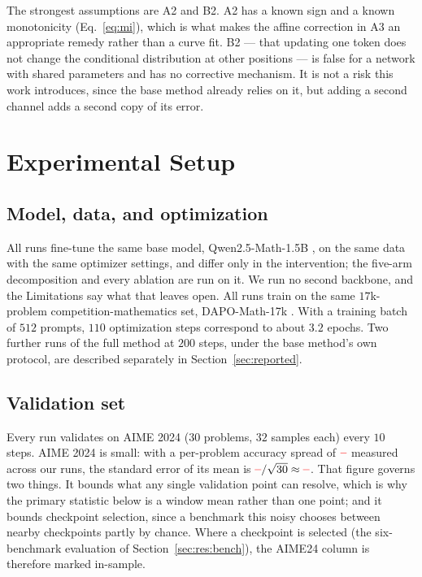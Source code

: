 \documentclass[11pt]{article}
\providecommand{\PENDING}{\textcolor{red}{\textbf{--}}}
\newcommand{\num}[1]{\ifcsname #1\endcsname\csname #1\endcsname\else\PENDING\fi}
\begin{document}
The strongest assumptions are A2 and B2. A2 has a known sign and a known monotonicity
(Eq.~\ref{eq:mi}), which is what makes the affine correction in A3 an appropriate
remedy rather than a curve fit. B2 --- that updating one token does not change the
conditional distribution at other positions --- is false for a network with shared
parameters and has no corrective mechanism. It is not a risk this work introduces,
since the base method already relies on it, but adding a second channel adds a second
copy of its error.

\section{Experimental Setup}
\label{sec:setup}

\subsection{Model, data, and optimization}

All runs fine-tune the same base model, Qwen2.5-Math-1.5B \citep{yang2024aqwen}, on the same data with
the same optimizer settings, and differ only in the intervention; the five-arm
decomposition and every ablation are run on it. We run no second backbone, and the
Limitations say what that leaves open. All runs train on the same $17$k-problem
competition-mathematics set, DAPO-Math-17k \citep{yu2025dapo}. With a training batch of $512$ prompts,
$110$ optimization steps correspond to about $3.2$ epochs. Two further runs of the
full method at $200$ steps, under the base method's own protocol, are described
separately in Section~\ref{sec:reported}.


\subsection{Validation set}
\label{sec:valset}

Every run validates on AIME 2024 ($30$ problems, $32$ samples each) every $10$ steps.
AIME 2024 is small: with a per-problem accuracy spread of $\num{STDaime}$ measured
across our runs, the standard error of its mean is
$\num{STDaime}/\sqrt{30} \approx \num{SEaime}$. That figure governs two things.
It bounds what any single validation point can resolve, which is why the primary
statistic below is a window mean rather than one point; and it bounds checkpoint
selection, since a benchmark this noisy chooses between nearby checkpoints partly by
chance. Where a checkpoint is selected (the six-benchmark evaluation of
Section~\ref{sec:res:bench}), the AIME24 column is therefore marked in-sample.
\end{document}
